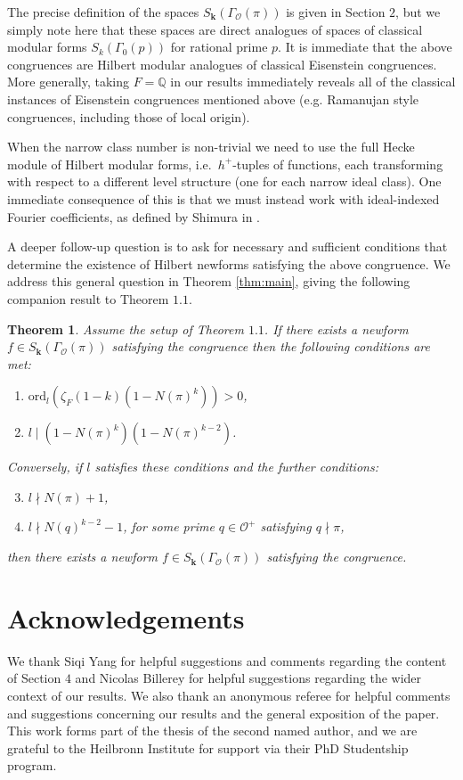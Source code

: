 \documentclass[a4paper,oneside]{amsart}
\theoremstyle{plain}
\newtheorem{thm}{Theorem}[section]
\theoremstyle{definition}
\begin{document}
The precise definition of the spaces $S_{\textbf{k}}(\Gamma_{\mathcal{O}}(\pi))$ is given in Section $2$, but we simply note here that these spaces are direct analogues of spaces of classical modular forms $S_k(\Gamma_0(p))$ for rational prime $p$. It is immediate that the above congruences are Hilbert modular analogues of classical Eisenstein congruences. More generally, taking $F = \mathbb{Q}$ in our results immediately reveals all of the classical instances of Eisenstein congruences mentioned above (e.g. Ramanujan style congruences, including those of local origin). 

When the narrow class number is non-trivial we need to use the full Hecke module of Hilbert modular forms, i.e.\ $h^+$-tuples of functions, each transforming with respect to a different level structure (one for each narrow ideal class). One immediate consequence of this is that we must instead work with ideal-indexed Fourier coefficients, as defined by Shimura in \cite{shimura}.

A deeper follow-up question is to ask for necessary and sufficient conditions that determine the existence of Hilbert newforms satisfying the above congruence. We address this general question in Theorem \ref{thm:main}, giving the following companion result to Theorem $1.1$.

\begin{thm}
    Assume the setup of Theorem $1.1$. If there exists a newform $f\in S_{\textbf{k}}(\Gamma_{\mathcal{O}}(\pi))$ satisfying the congruence then the following conditions are met: 
    \begin{enumerate}
        \item $\text{ord}_{l}(\zeta_F(1-k)(1-N(\pi)^k)) > 0$,
        \item $l \mid (1-N(\pi)^k)(1-N(\pi)^{k-2})$.
    \end{enumerate}
Conversely, if $l$ satisfies these conditions and the further conditions:
\begin{enumerate}\setcounter{enumi}{2}
        \item $l \nmid N(\pi)+1$, 
        \item $l \nmid N(q)^{k-2}-1$, for some prime $q\in\mathcal{O}^+$ satisfying $q\nmid\pi$,
    \end{enumerate}
    then there exists a newform $f\in S_{\textbf{k}}(\Gamma_{\mathcal{O}}(\pi))$ satisfying the congruence.
\end{thm}
\setcounter{section}{1}

\section*{Acknowledgements}
We thank Siqi Yang for helpful suggestions and comments regarding the content of Section $4$ and Nicolas Billerey for helpful suggestions regarding the wider context of our results. We also thank an anonymous referee for helpful comments and suggestions concerning our results and the general exposition of the paper. This work forms part of the thesis of the second named author, and we are grateful to the Heilbronn Institute for support via their PhD Studentship program.
\end{document}
